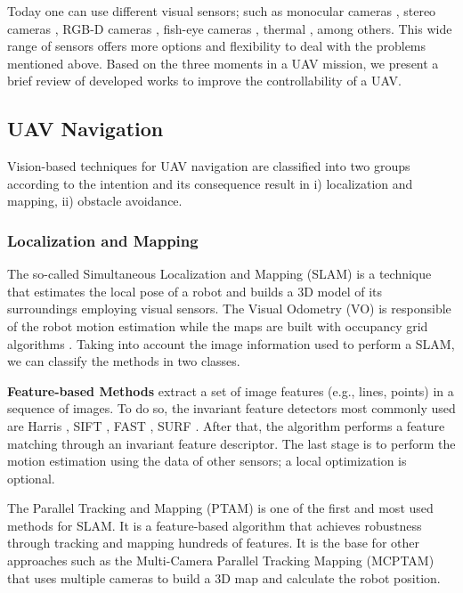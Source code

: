 Today one can use different visual sensors; such as monocular cameras \cite{Padhy.Xia.ea:TSC:2018}, stereo cameras \cite{Seitz.Curless.ea:CVPR:2006}, RGB-D cameras \cite{Huang.Bachrach.ea:RobR:2017}, fish-eye cameras \cite{Hrabar.Sukhatme:IROS:2004}, thermal \cite{Gaszczak.Breckon.ea:IRCV:2011}, among others. This wide range of sensors offers more options and flexibility to deal with the problems mentioned above. Based on the three moments in a UAV mission, we present a brief review of developed works to improve the controllability of a UAV. 

\subsection{UAV Navigation}
Vision-based techniques for UAV navigation are classified into two groups according to the intention and its consequence result in i) localization and mapping, ii) obstacle avoidance.

\subsubsection{Localization and Mapping}
The so-called Simultaneous Localization and Mapping (SLAM) is a technique that estimates the local pose of a robot and builds a 3D model of its surroundings employing visual sensors. The Visual Odometry (VO) \cite{Scaramuzza.Fraundorfer:RAM:2011} is responsible of the robot motion estimation while the maps are built with occupancy grid algorithms \cite{Thrun.Bu:AI:1996}. Taking into account the image information used to perform a SLAM, we can classify the methods in two classes.

\textbf{Feature-based Methods} extract a set of image features (e.g., lines, points) in a sequence of images. To do so, the invariant feature detectors most commonly used are Harris \cite{Harris.Stephens:AVC:1988}, SIFT \cite{Lowe:ICCV:1999}, FAST \cite{Rosten.Drummond:ECCV:2006}, SURF \cite{Bay.Ess.ea:CVIU:2008}. After that, the algorithm performs a feature matching through an invariant feature descriptor. The last stage is to perform the motion estimation using the data of other sensors; a local optimization is optional. 

The Parallel Tracking and Mapping (PTAM) \cite{Klein.Murray:ISMAR:2007} is one of the first and most used methods for SLAM. It is a feature-based algorithm that achieves robustness through tracking and mapping hundreds of features. It is the base for other approaches such as the Multi-Camera Parallel Tracking Mapping (MCPTAM) \cite{Harmat.Trentini.ea:IROS:2015} that uses multiple cameras to build a 3D map and calculate the robot position. \\

